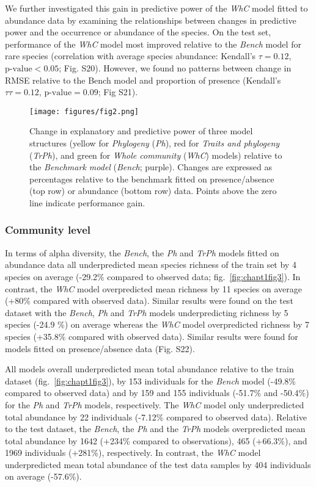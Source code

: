 \documentclass[9pt,biorxiv,doublespacing,lineno]{lapreprint}
\begin{document}
We further investigated this gain in predictive power of the \emph{WhC}
model fitted to abundance data by examining the relationships between
changes in predictive power and the occurrence or abundance of the
species. On the test set, performance of the \emph{WhC} model most
improved relative to the \emph{Bench} model for rare species
(correlation with average species abundance: Kendall's \(\tau = 0.12\),
\(\text{p-value} < 0.05\); Fig. S20). However, we found no patterns
between change in RMSE relative to the Bench model and proportion of
presence (Kendall's \(τ\tau = 0.12\), \(\text{p-value} = 0.09\); Fig
S21).

\begin{figure}
\hypertarget{fig:chapt1fig2}{%
\centering
\texttt{[image: figures/fig2.png]}
\caption{Change in explanatory and predictive power of three model
structures (yellow for \emph{Phylogeny} (\emph{Ph}), red for
\emph{Traits and phylogeny} (\emph{TrPh}), and green for \emph{Whole
community} (\emph{WhC}) models) relative to the \emph{Benchmark model}
(\emph{Bench}; purple). Changes are expressed as percentages relative to
the benchmark fitted on presence/absence (top row) or abundance (bottom
row) data. Points above the zero line indicate performance
gain.}\label{fig:chapt1fig2}
}
\end{figure}

\hypertarget{community-level}{%
\subsubsection{Community level}\label{community-level}}

In terms of alpha diversity, the \emph{Bench}, the \emph{Ph} and
\emph{TrPh} models fitted on abundance data all underpredicted mean
species richness of the train set by 4 species on average (-29.2\%
compared to observed data; fig.~\ref{fig:chapt1fig3}). In contrast, the
\emph{WhC} model overpredicted mean richness by 11 species on average
(+80\% compared with observed data). Similar results were found on the
test dataset with the \emph{Bench}, \emph{Ph} and \emph{TrPh} models
underpredicting richness by 5 species (-24.9 \%) on average whereas the
\emph{WhC} model overpredicted richness by 7 species (+35.8\% compared
with observed data). Similar results were found for models fitted on
presence/absence data (Fig. S22).

All models overall underpredicted mean total abundance relative to the
train dataset (fig.~\ref{fig:chapt1fig3}), by 153 individuals for the
\emph{Bench} model (-49.8\% compared to observed data) and by 159 and
155 individuals (-51.7\% and -50.4\%) for the \emph{Ph} and \emph{TrPh}
models, respectively. The \emph{WhC} model only underpredicted total
abundance by 22 individuals (-7.12\% compared to observed data).
Relative to the test dataset, the \emph{Bench}, the \emph{Ph} and the
\emph{TrPh} models overpredicted mean total abundance by 1642 (+234\%
compared to observations), 465 (+66.3\%), and 1969 individuals (+281\%),
respectively. In contrast, the \emph{WhC} model underpredicted mean
total abundance of the test data samples by 404 individuals on average
(-57.6\%).
\end{document}
